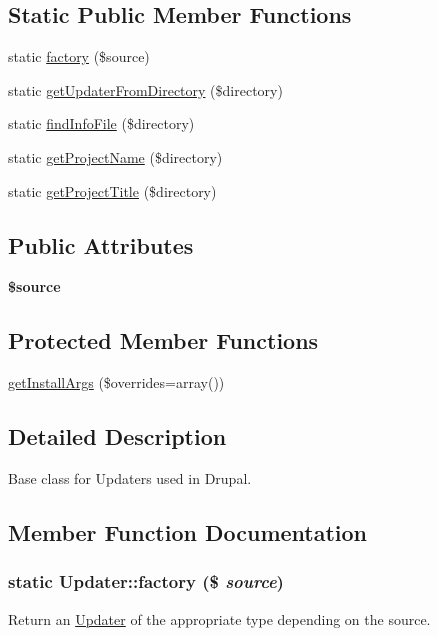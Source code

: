 \subsection*{Static Public Member Functions}
\begin{DoxyCompactItemize}
\item 
static \hyperlink{classUpdater_a83e2eb6b587a2302d54f0bf36c1940d7}{factory} (\$source)
\item 
static \hyperlink{classUpdater_a84f76400d1eb8fc288c6544028044e11}{getUpdaterFromDirectory} (\$directory)
\item 
static \hyperlink{classUpdater_a863027ebe605c77fe1c9b7676eb031f1}{findInfoFile} (\$directory)
\item 
static \hyperlink{classUpdater_a092911b55da504e51b523dce6307b948}{getProjectName} (\$directory)
\item 
static \hyperlink{classUpdater_ae54d59f8b1bc166661a9393004c2d5f1}{getProjectTitle} (\$directory)
\end{DoxyCompactItemize}
\subsection*{Public Attributes}
\begin{DoxyCompactItemize}
\item 
\hypertarget{classUpdater_a3388dd45f12f22a43ed104cb9df6b2ce}{
{\bfseries \$source}}
\label{classUpdater_a3388dd45f12f22a43ed104cb9df6b2ce}

\end{DoxyCompactItemize}
\subsection*{Protected Member Functions}
\begin{DoxyCompactItemize}
\item 
\hyperlink{classUpdater_a540e2f8213091a530b45d1bb4edbc36a}{getInstallArgs} (\$overrides=array())
\end{DoxyCompactItemize}


\subsection{Detailed Description}
Base class for Updaters used in Drupal. 

\subsection{Member Function Documentation}
\hypertarget{classUpdater_a83e2eb6b587a2302d54f0bf36c1940d7}{
\subsubsection[{factory}]{\setlength{\rightskip}{0pt plus 5cm}static Updater::factory (\$ {\em source})}}
\label{classUpdater_a83e2eb6b587a2302d54f0bf36c1940d7}
Return an \hyperlink{classUpdater}{Updater} of the appropriate type depending on the source.

